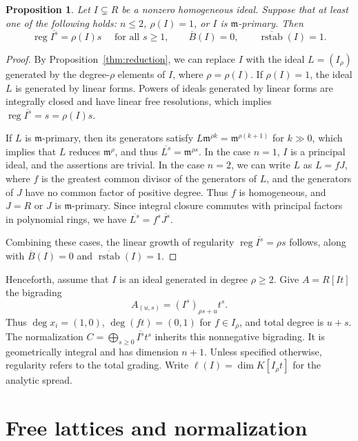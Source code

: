\documentclass[12pt]{amsart}
\numberwithin{equation}{section}
\newtheorem{proposition}[theorem]{Proposition}
\theoremstyle{definition}
\theoremstyle{remark}
\numberwithin{equation}{section}
\DeclareMathOperator{\reg}{reg}
\newcommand{\m}{\mathfrak m}
\newcommand{\Bn}{\overline B}
\newcommand{\rstabn}{\overline{\operatorname{rstab}}}
\begin{document}
\begin{proposition}\label{prop:elementary-cases}
	 Let $I\subsetneq R$ be a nonzero homogeneous ideal. Suppose that at least one of the following holds: $n\le2$, $\rho(I)=1$, or $I$ is $\m$-primary. Then
	\[
	\reg\overline{I^s}=\rho(I)s\quad    \text{ for all     } s\ge 1,\qquad
	\Bn(I)=0,\qquad\rstabn(I)=1.
	\]
\end{proposition}
\begin{proof}
	By Proposition~\ref{thm:reduction}, we can replace $I$ with the ideal $L=(I_\rho)$  generated by the degree-$\rho$ elements of $I$, where $\rho=\rho(I)$. 	If $\rho(I)=1$, the ideal  $L$ is generated by linear forms.  Powers of ideals generated by linear forms are integrally closed and have linear free resolutions, which implies $\reg\overline{I^s} = s = \rho(I)s$.
	
If $L$ is $\mathfrak{m}$-primary, then its generators satisfy $L\mathfrak{m}^{\rho k}=\mathfrak{m}^{\rho(k+1)}$ for $k\gg0$, which implies that $L$ reduces $\mathfrak{m}^\rho$, and thus $\overline{L^s}=\mathfrak{m}^{\rho s}$. 	In the case $n=1$,  $I$ is a principal ideal, and the assertions are trivial.
	In the case $n=2$, we can write $L$ as $L = fJ$, where  $f$  is the greatest common divisor of the generators of $L$, and the generators of $J$ have no common factor of positive degree. Thus $f$ is homogeneous, and  $J = R$ or $J$ is $\mathfrak{m}$-primary. Since integral closure commutes with principal factors in polynomial rings, we have $\overline{L^s} = f^s \overline{J^s}$.
	
	Combining these cases, the linear growth of regularity $\reg\overline{I^s} = \rho s$ follows, along with $\Bn(I) = 0$ and $\rstabn(I) = 1$.
\end{proof}
Henceforth, assume that $I$ is 	an ideal generated in degree $\rho \ge 2$. Give $A = R[It]$ the bigrading
\[
A_{(u,s)} = (I^s)_{\rho s + u} t^s.
\]
Thus $\deg x_i = (1,0)$, $\deg(ft) = (0,1)$ for $f \in I_\rho$, and total degree is $u+s$. The normalization $C = \bigoplus_{s \ge 0} \overline{I^s} t^s$ inherits this nonnegative bigrading. It is geometrically integral and has dimension $n+1$.
Unless specified otherwise, regularity refers to the total grading. Write $\ell(I) = \operatorname{dim} K[I_\rho t]$ for the analytic spread.

\section{Free lattices and normalization}
\label{sec:normalization}
\end{document}
